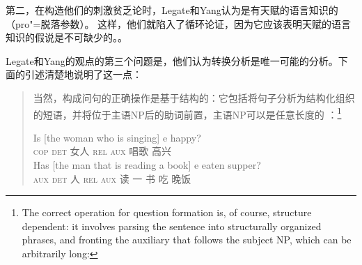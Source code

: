 第二，在构造他们的刺激贫乏论时，Legate和Yang认为是有天赋的语言知识的（pro"=脱落参数）。
这样，他们就陷入了循环论证，因为它应该表明天赋的语言知识的假说是不可缺少的。\citep[]{SP2002b}。

Legate和Yang的观点的第三个问题是，他们认为转换分析是唯一可能的分析。下面的引述清楚地说明了这一点\citep[]{LY2002a}：
\begin{quotation}
当然，构成问句的正确操作是基于结构的：它包括将句子分析为结构化组织的短语，并将位于主语NP后的助词前置，主语NP可以是任意长度的 ：\footnote{%
The correct operation for question formation is, of course, structure dependent: it involves parsing
the sentence into structurally organized phrases, and fronting the auxiliary that follows the
subject NP, which can be arbitrarily long:
}
\begin{exe}
\begin{xlist}
\ex 
\gll Is [the woman who is singing] e happy?\\
\textsc{cop} \spacebr\textsc{det} 女人 \textsc{rel} \textsc{aux} 唱歌 {} 高兴\\
\ex 
\gll Has [the man that is reading a book] e eaten supper?\\
\textsc{aux} \spacebr\textsc{det} 人 \textsc{rel} \textsc{aux} 读 一 书 {} 吃 晚饭\\
\end{xlist}
\end{exe}
\end{quotation}

